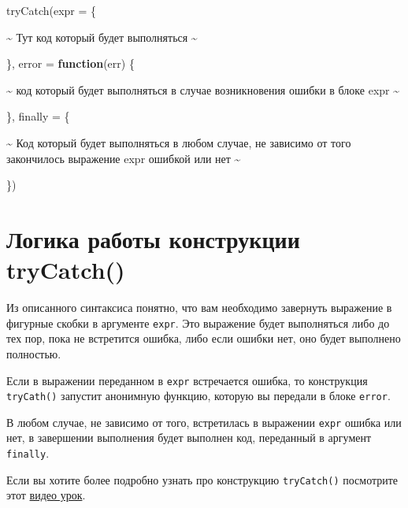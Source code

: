 \documentclass[
]{book}
\newenvironment{Shaded}{\begin{snugshade}}{\end{snugshade}}
\newcommand{\AttributeTok}[1]{\textcolor[rgb]{0.77,0.63,0.00}{#1}}
\newcommand{\ControlFlowTok}[1]{\textcolor[rgb]{0.13,0.29,0.53}{\textbf{#1}}}
\newcommand{\FunctionTok}[1]{\textcolor[rgb]{0.00,0.00,0.00}{#1}}
\newcommand{\NormalTok}[1]{#1}
\newcommand{\SpecialCharTok}[1]{\textcolor[rgb]{0.00,0.00,0.00}{#1}}
\begin{document}
\begin{Shaded}
\begin{Highlighting}[]
\FunctionTok{tryCatch}\NormalTok{(}\AttributeTok{expr =}\NormalTok{ \{}
  
    \SpecialCharTok{\textasciitilde{}}\NormalTok{ Тут код который будет выполняться }\SpecialCharTok{\textasciitilde{}}
  
\NormalTok{\}, }
  \AttributeTok{error =} \ControlFlowTok{function}\NormalTok{(err) \{}
    
    \SpecialCharTok{\textasciitilde{}}\NormalTok{ код который будет выполняться в случае возникновения ошибки в блоке expr }\SpecialCharTok{\textasciitilde{}}
    
\NormalTok{  \}, }
  \AttributeTok{finally =}\NormalTok{ \{}
    
    \SpecialCharTok{\textasciitilde{}}\NormalTok{ Код который будет выполняться в любом случае, не зависимо от того закончилось выражение expr ошибкой или нет }\SpecialCharTok{\textasciitilde{}}
    
\NormalTok{  \})}
\end{Highlighting}
\end{Shaded}

\hypertarget{ux43bux43eux433ux438ux43aux430-ux440ux430ux431ux43eux442ux44b-ux43aux43eux43dux441ux442ux440ux443ux43aux446ux438ux438-trycatch}{%
\section{Логика работы конструкции tryCatch()}\label{ux43bux43eux433ux438ux43aux430-ux440ux430ux431ux43eux442ux44b-ux43aux43eux43dux441ux442ux440ux443ux43aux446ux438ux438-trycatch}}

Из описанного синтаксиса понятно, что вам необходимо завернуть выражение в фигурные скобки в аргументе \texttt{expr}. Это выражение будет выполняться либо до тех пор, пока не встретится ошибка, либо если ошибки нет, оно будет выполнено полностью.

Если в выражении переданном в \texttt{expr} встречается ошибка, то конструкция \texttt{tryCath()} запустит анонимную функцию, которую вы передали в блоке \texttt{error}.

В любом случае, не зависимо от того, встретилась в выражении \texttt{expr} ошибка или нет, в завершении выполнения будет выполнен код, переданный в аргумент \texttt{finally}.

Если вы хотите более подробно узнать про конструкцию \texttt{tryCatch()} посмотрите этот \href{https://youtu.be/GvmjW34IHu8}{видео урок}.
\end{document}
